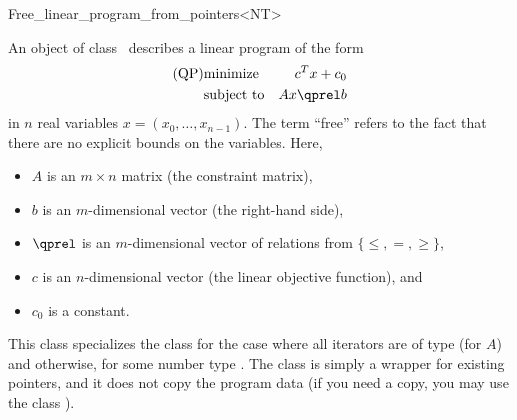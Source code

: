 \begin{ccRefClass}{Free_linear_program_from_pointers<NT>}


\ccDefinition
An object of class \ccRefName\ describes a linear program of the form
\begin{eqnarray*}
\mbox{(QP)}& \mbox{minimize} & c^{T}x+c_0 \\
&\mbox{subject to}   & Ax\qprel b
\end{eqnarray*}
in $n$ real variables $x=(x_0,\ldots,x_{n-1})$. The term ``free'' refers
to the fact that there are no explicit bounds on the variables.
Here, 
\begin{itemize}
\item $A$ is an $m\times n$ matrix (the constraint matrix), 
\item $b$ is an $m$-dimensional vector (the right-hand side),
\item $\qprel$ is an $m$-dimensional vector of relations 
from $\{\leq, =, \geq\}$, 
\item $c$ is an $n$-dimensional vector (the linear objective
  function), and 
\item $c_0$ is a constant.
\end{itemize}

This class specializes the class
 for the case where all iterators are of type 
 (for
$A$) and  otherwise, for some number type . 
The class is simply a wrapper for 
existing pointers, and it does not copy the program data (if you need
a copy, you may use the class ).

\ccIsModel
{}

\ccSeeAlso
{}\\

\end{ccRefClass}
